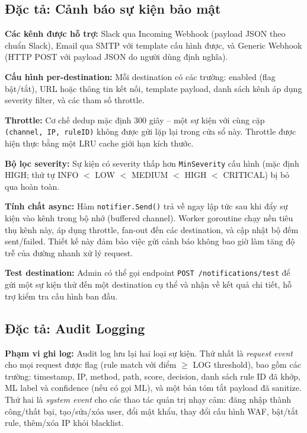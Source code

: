 \documentclass[../DoAn.tex]{subfiles}
\begin{document}
\subsection{Đặc tả: Cảnh báo sự kiện bảo mật}
\label{subsection:2.3.4}

\textbf{Các kênh được hỗ trợ:} Slack qua Incoming Webhook (payload JSON theo
chuẩn Slack), Email qua SMTP với template cấu hình được, và Generic Webhook
(HTTP POST với payload JSON do người dùng định nghĩa).

\textbf{Cấu hình per-destination:} Mỗi destination có các trường: enabled (flag
bật/tắt), URL hoặc thông tin kết nối, template payload, danh sách kênh áp
dụng severity filter, và các tham số throttle.

\textbf{Throttle:} Cơ chế dedup mặc định 300 giây -- một sự kiện với cùng cặp
\texttt{(channel, IP, ruleID)} không được gửi lặp lại trong cửa sổ này. Throttle
được hiện thực bằng một LRU cache giới hạn kích thước.

\textbf{Bộ lọc severity:} Sự kiện có severity thấp hơn \texttt{MinSeverity}
cấu hình (mặc định HIGH; thứ tự INFO \(<\) LOW \(<\) MEDIUM \(<\) HIGH \(<\)
CRITICAL) bị bỏ qua hoàn toàn.

\textbf{Tính chất async:} Hàm \texttt{notifier.Send()} trả về ngay lập tức sau
khi đẩy sự kiện vào kênh trong bộ nhớ (buffered channel). Worker goroutine
chạy nền tiêu thụ kênh này, áp dụng throttle, fan-out đến các destination, và
cập nhật bộ đếm sent/failed. Thiết kế này đảm bảo việc gửi cảnh báo không bao
giờ làm tăng độ trễ của đường nhanh xử lý request.

\textbf{Test destination:} Admin có thể gọi endpoint \texttt{POST
/notifications/test} để gửi một sự kiện thử đến một destination cụ thể và
nhận về kết quả chi tiết, hỗ trợ kiểm tra cấu hình ban đầu.

\subsection{Đặc tả: Audit Logging}
\label{subsection:2.3.5}

\textbf{Phạm vi ghi log:} Audit log lưu lại hai loại sự kiện. Thứ nhất là
\textit{request event} cho mọi request được flag (rule match với điểm \(\ge\)
LOG threshold), bao gồm các trường: timestamp, IP, method, path, score,
decision, danh sách rule ID đã khớp, ML label và confidence (nếu có gọi ML),
và một bản tóm tắt payload đã sanitize. Thứ hai là \textit{system event} cho
các thao tác quản trị nhạy cảm: đăng nhập thành công/thất bại, tạo/sửa/xóa
user, đổi mật khẩu, thay đổi cấu hình WAF, bật/tắt rule, thêm/xóa IP khỏi
blacklist.
\end{document}
